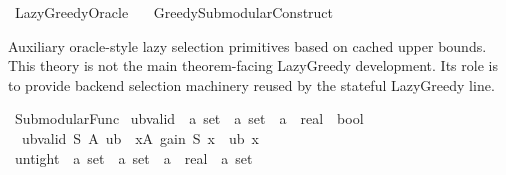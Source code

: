 %
\begin{isabellebody}%
%
%
\isadelimtheory
%
\endisadelimtheory
%
\isatagtheory
{}\isamarkupfalse%
\ Lazy{\isacharunderscore}{\kern0pt}Greedy{\isacharunderscore}{\kern0pt}Oracle\isanewline
\ \ \ {\isachardoublequoteopen}Greedy{\isacharunderscore}{\kern0pt}Submodular{\isacharunderscore}{\kern0pt}Construct{\isachardoublequoteclose}\isanewline
{}%
\endisatagtheory
{\isafoldtheory}%
%
\isadelimtheory
%
\endisadelimtheory
%
\begin{isamarkuptext}%
Auxiliary oracle-style lazy selection primitives based on cached upper bounds.
  This theory is not the main theorem-facing LazyGreedy development.
  Its role is to provide backend selection machinery reused by the stateful
  LazyGreedy line.%
\end{isamarkuptext}\isamarkuptrue%
%
\isadelimdocument
%
\endisadelimdocument
%
\isatagdocument
%
\isamarkuptrue%
%
\endisatagdocument
{\isafolddocument}%
%
\isadelimdocument
%
\endisadelimdocument
{}\isamarkupfalse%
\ Submodular{\isacharunderscore}{\kern0pt}Func\isanewline
{}\isanewline
\isanewline
{}\isamarkupfalse%
\ ub{\isacharunderscore}{\kern0pt}valid\ {\isacharcolon}{\kern0pt}{\isacharcolon}{\kern0pt}\ {\isachardoublequoteopen}{\isacharprime}{\kern0pt}a\ set\ {\isasymRightarrow}\ {\isacharprime}{\kern0pt}a\ set\ {\isasymRightarrow}\ {\isacharparenleft}{\kern0pt}{\isacharprime}{\kern0pt}a\ {\isasymRightarrow}\ real{\isacharparenright}{\kern0pt}\ {\isasymRightarrow}\ bool{\isachardoublequoteclose}\ \isanewline
\ \ {\isachardoublequoteopen}ub{\isacharunderscore}{\kern0pt}valid\ S\ A\ ub\ {\isasymlongleftrightarrow}\ {\isacharparenleft}{\kern0pt}{\isasymforall}x{\isasymin}A{\isachardot}{\kern0pt}\ gain\ S\ x\ {\isasymle}\ ub\ x{\isacharparenright}{\kern0pt}{\isachardoublequoteclose}\isanewline
\isanewline
{}\isamarkupfalse%
\ untight\ {\isacharcolon}{\kern0pt}{\isacharcolon}{\kern0pt}\ {\isachardoublequoteopen}{\isacharprime}{\kern0pt}a\ set\ {\isasymRightarrow}\ {\isacharprime}{\kern0pt}a\ set\ {\isasymRightarrow}\ {\isacharparenleft}{\kern0pt}{\isacharprime}{\kern0pt}a\ {\isasymRightarrow}\ real{\isacharparenright}{\kern0pt}\ {\isasymRightarrow}\ {\isacharprime}{\kern0pt}a\ set{\isachardoublequoteclose}\ \isanewline

\end{isabellebody}
